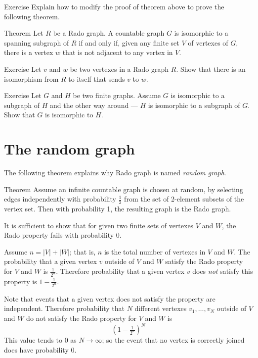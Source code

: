 \begin{thm}{Exercise}
Explain how to modify the proof of theorem above to prove the following theorem.
\end{thm}


\begin{thm}{Theorem}
Let $R$ be a Rado graph.
A countable graph $G$ is isomorphic to a spanning subgraph of $R$ if and only if, given any finite set $V$ of vertexes of $G$, there is a vertex $w$ that is not adjacent to any vertex in $V$.
\end{thm}

\begin{thm}{Exercise}
Let $v$ and $w$ be two vertexes in a Rado graph $R$.
Show that there is an isomorphism from $R$ to itself that sends $v$ to $w$.
\end{thm}

\begin{thm}{Exercise}\label{ex:finite-subgraphs}
Let $G$ and $H$ be two finite graphs.
Assume $G$ is isomorphic to a subgraph of $H$ 
and the other way around --- $H$ is isomorphic to a subgraph of $G$.
Show that $G$ is isomorphic to $H$.
\end{thm}


\section*{The random graph}

The following theorem explains why Rado graph is named {}\emph{random graph}.

\begin{thm}{Theorem}\label{thm:the-random-graph}
Assume an infinite countable graph is chosen at random, by selecting edges independently with probability $\tfrac12$ from the set of 2-element subsets of the vertex set.
Then with probability 1, the resulting graph is the Rado graph.
\end{thm}

It is sufficient to show that for given two finite sets of vertexes $V$ and $W$, the Rado property fails with probability 0.

Assume $n=|V|+|W|$; that is, $n$ is the total number of vertexes in $V$ and $W$.
The probability that a given vertex $v$ outside of $V$ and $W$ satisfy the Rado property for $V$ and $W$
is $\tfrac1{2^n}$.
Therefore probability that a given vertex $v$ does {}\emph{not} satisfy this property
is $1-\tfrac1{2^n}$.

Note that events that a given vertex does not satisfy the property are independent.
Therefore probability that $N$ different vertexes $v_1,\dots,v_N$ outside of $V$ and $W$ do not satisfy the Rado property for $V$ and $W$ is 
\[(1-\tfrac1{2^n})^N\]
This value tends to 0 as $N \to \infty$; so the event that no vertex is correctly joined does have probability
0.
\qeds

